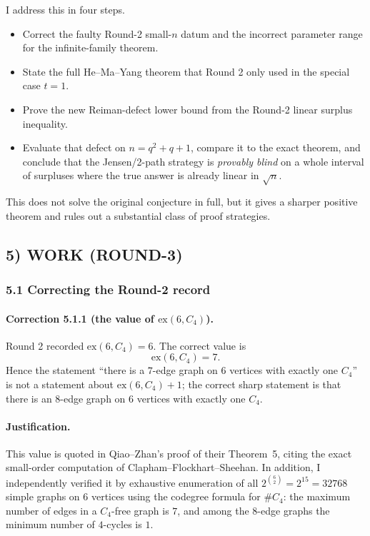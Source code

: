 I address this in four steps.
\begin{itemize}
\item Correct the faulty Round-2 small-$n$ datum and the incorrect parameter range for the infinite-family theorem.
\item State the full He--Ma--Yang theorem that Round 2 only used in the special case $t=1$.
\item Prove the new Reiman-defect lower bound from the Round-2 linear surplus inequality.
\item Evaluate that defect on $n=q^2+q+1$, compare it to the exact theorem, and conclude that the Jensen/2-path strategy is \emph{provably blind} on a whole interval of surpluses where the true answer is already linear in $\sqrt n$.
\end{itemize}

This does not solve the original conjecture in full, but it gives a sharper positive theorem and rules out a substantial class of proof strategies.

\subsection*{5) WORK (ROUND-3)}

\subsubsection*{5.1 Correcting the Round-2 record}

\paragraph{Correction 5.1.1 (the value of $\mathrm{ex}(6,C_4)$).}
Round 2 recorded $\mathrm{ex}(6,C_4)=6$. The correct value is
\[
\mathrm{ex}(6,C_4)=7.
\]
Hence the statement ``there is a $7$-edge graph on $6$ vertices with exactly one $C_4$'' is not a statement about $\mathrm{ex}(6,C_4)+1$; the correct sharp statement is that there is an $8$-edge graph on $6$ vertices with exactly one $C_4$.

\paragraph{Justification.}
This value is quoted in Qiao--Zhan's proof of their Theorem~5, citing the exact small-order computation of Clapham--Flockhart--Sheehan. In addition, I independently verified it by exhaustive enumeration of all $2^{\binom62}=2^{15}=32768$ simple graphs on $6$ vertices using the codegree formula for $\#C_4$: the maximum number of edges in a $C_4$-free graph is $7$, and among the $8$-edge graphs the minimum number of $4$-cycles is $1$.

